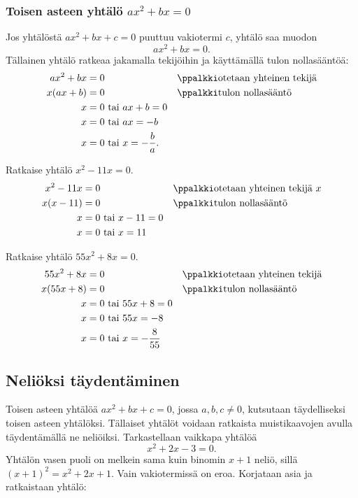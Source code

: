 \subsubsection*{Toisen asteen yhtälö $ax^2+bx=0$}
Jos yhtälöstä $ax^2+bx+c=0$ puuttuu vakiotermi $c$, yhtälö saa muodon 
$$ax^2+bx=0.$$ Tällainen yhtälö ratkeaa jakamalla tekijöihin ja käyttämällä tulon nollasääntöä:
\begin{align*}
ax^2+bx&=0 \ \ \ \ \ &&\ppalkki\text{otetaan yhteinen tekijä} \\
x(ax+b)&=0 \ \ \ \ \ &&\ppalkki\text{tulon nollasääntö} \\
x&=0 \text{ tai } ax+b=0 \\
x&=0 \text{ tai } ax=-b \\
x&=0 \text{ tai } x=-\frac{b}{a}.
\end{align*}
\begin{esimerkki}
Ratkaise yhtälö $x^2-11x=0$.
\begin{align*}
x^2-11x&=0 \ \ \ \ \  &&\ppalkki\text{otetaan yhteinen tekijä } x\\
x(x-11)&=0 \ \ \ \ \ &&\ppalkki\text{tulon nollasääntö} \\
x&=0 \text{ tai } x-11=0 \\
x&=0 \text{ tai } x=11
\end{align*}
\end{esimerkki}

\begin{esimerkki}
Ratkaise yhtälö $55x^2+8x=0$.
\begin{align*}
55x^2+8x&=0 \ \ \ \ \ &&\ppalkki\text{otetaan yhteinen tekijä} \\
x(55x+8)&=0 \ \ \ \ \ &&\ppalkki\text{tulon nollasääntö} \\
x&=0 \text{ tai } 55x+8=0 \\
x&=0 \text{ tai } 55x=-8 \\
x&=0 \text{ tai } x=-\frac{8}{55}
\end{align*}
\end{esimerkki}

\subsection*{Neliöksi täydentäminen}
Toisen asteen yhtälöä $ax^2+bx+c=0$, jossa $a,b,c \neq 0$, kutsutaan
täydelliseksi toisen asteen yhtälöksi. Tällaiset yhtälöt voidaan ratkaista muistikaavojen avulla täydentämällä ne neliöiksi.
Tarkastellaan vaikkapa yhtälöä
\[x^2+2x-3=0.\]
Yhtälön vasen puoli on melkein sama kuin binomin $x+1$ neliö, sillä $(x+1)^2=x^2+2x+1$.
Vain vakiotermissä on eroa. Korjataan asia ja ratkaistaan yhtälö:

